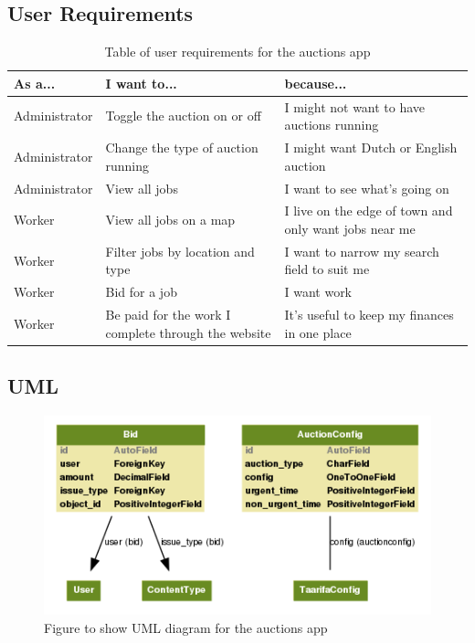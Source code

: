 \subsection{User Requirements}
\begin{table}[h]
\centering
\begin{tabular}{p{2.9cm}p{4.1cm}p{4.1cm}}
\textbf{As a...} & \textbf{I want to...} & \textbf{because...} \\
\hline
Administrator & Toggle the auction on or off & I might not want to have auctions running \\
\hline
Administrator & Change the type of auction running & I might want Dutch or English auction \\
\hline
Administrator & View all jobs & I want to see what's going on \\
\hline
Worker & View all jobs on a map & I live on the edge of town and only want jobs near me \\
\hline
Worker & Filter jobs by location and type & I want to narrow my search field to suit me \\
\hline
Worker & Bid for a job & I want work \\
\hline
Worker & Be paid for the work I complete through the website & It's useful to keep my finances in one place \\
\end{tabular}
\caption{Table of user requirements for the auctions app}
\label{tab:auc:req}
\end{table}

\subsection{UML}
\begin{figure}
\centering
\includegraphics[scale=0.51]{img/auctions.png}
\caption{Figure to show UML diagram for the auctions app}
\label{fig:auc:uml}
\end{figure}

